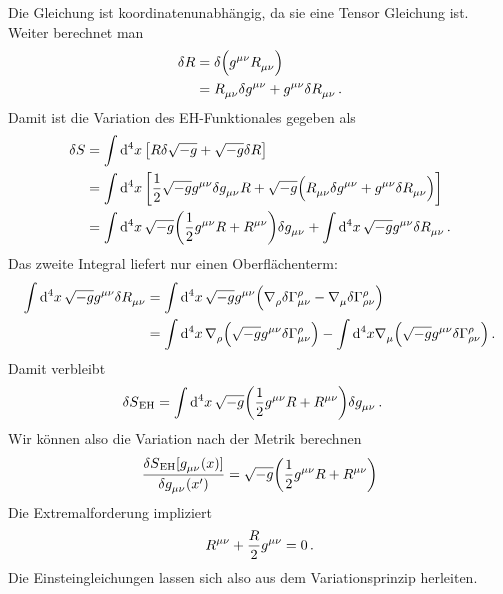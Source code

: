 Die Gleichung ist koordinatenunabhängig, da sie eine Tensor Gleichung ist.
Weiter berechnet man 
\begin{equation}
\begin{split}
\delta R &=\delta \left(\tensor{g}{^\mu^\nu}\tensor{R}{_\mu_\nu}\right)\\
&=\tensor{R}{_\mu_\nu}\delta\tensor{g}{^\mu^\nu}
+\tensor{g}{^\mu^\nu}\delta\tensor{R}{_\mu_\nu}\,.
\end{split}
\end{equation}
Damit ist die Variation des EH-Funktionales gegeben als
\begin{equation}
\begin{split}
\delta S
&=\fourint \left[
R\delta\sqrt{-g}+\sqrt{-g}\delta R\right]\\
&=\fourint \left[
\frac{1}{2}\sqrt{-g}\tensor{g}{^\mu^\nu}\delta\tensor{g}{_\mu_\nu}
R+\sqrt{-g}\left(\tensor{R}{_\mu_\nu}\delta\tensor{g}{^\mu^\nu}
+\tensor{g}{^\mu^\nu}\delta\tensor{R}{_\mu_\nu}\right)\right]\\
&=\fourint \sqrt{-g}\left(
\frac{1}{2}\tensor{g}{^\mu^\nu}
R+\tensor{R}{^\mu^\nu}\right)\delta\tensor{g}{_\mu_\nu}
+\fourint \sqrt{-g}\tensor{g}{^\mu^\nu}\delta\tensor{R}{_\mu_\nu}
\,.
\end{split}
\end{equation}
Das zweite Integral liefert nur einen Oberflächenterm:
\begin{equation}
\begin{split}
\fourint \sqrt{-g}\tensor{g}{^\mu^\nu}\delta\tensor{R}{_\mu_\nu}
&=\fourint \sqrt{-g}\tensor{g}{^\mu^\nu}\left(\tensor{\nabla}{_\rho}\delta
\cSym{\rho}{\mu}{\nu} -\tensor{\nabla}{_\mu}\delta \cSym{\rho}{\rho}{\nu}\right)
\\
&=\fourint \tensor{\nabla}{_\rho}\left(\sqrt{-g}\tensor{g}{^\mu^\nu}\delta
\cSym{\rho}{\mu}{\nu}\right)-\int\dif{}^4 x \tensor{\nabla}{_\mu}\left(\sqrt{-g}\tensor{g}{^\mu^\nu}\delta
\cSym{\rho}{\rho}{\nu}\right)\,.
\end{split}
\end{equation}
Damit verbleibt 
\begin{equation}
\begin{split}
\delta S\textsubscript{EH}
&=\fourint \sqrt{-g}\left(
\frac{1}{2}\tensor{g}{^\mu^\nu}
R+\tensor{R}{^\mu^\nu}\right)\delta\tensor{g}{_\mu_\nu}\,.
\end{split}
\end{equation}
Wir können also die Variation nach der Metrik berechnen 
\begin{equation}
\frac{\delta
S\textsubscript{EH}[\tensor{g}{_\mu_\nu}(x)]}{\delta\tensor{g}{_\mu_\nu}(x')}
=\sqrt{-g}\left(\frac{1}{2}\tensor{g}{^\mu^\nu}
R+\tensor{R}{^\mu^\nu}\right)
\end{equation}
Die Extremalforderung impliziert
\begin{equation}
\tensor{R}{^\mu^\nu}+\frac{R}{2}\tensor{g}{^\mu^\nu}=0\, .
\end{equation}
Die Einsteingleichungen lassen sich also aus dem Variationsprinzip herleiten.
